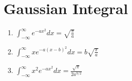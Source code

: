 \section{Gaussian Integral}
    \begin{enumerate}
        \item $\int_{-\infty}^{\infty} e^{-ax^2} dx = \sqrt{\frac{\pi}{a}}$
        \item $\int_{-\infty}^{\infty} x e^{-a(x-b)^2} dx = b \sqrt{\frac{\pi}{a}}$
        \item $\int_{-\infty}^{\infty} x^2 e^{-ax^2} dx = \frac{\sqrt{\pi}}{2a^{3/2}}$
    \end{enumerate}

